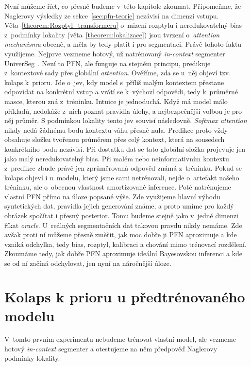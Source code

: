 Nyní můžeme říct, co přesně budeme v~této kapitole zkoumat.
Připomeňme, že Naglerovy výsledky ze sekce~\ref{sec:pfn-teorie} nezávisí na dimenzi vstupu.
Věta~\ref{theorem:Rozptyl_transformeru} o~mizení rozptylu i neredukovatelný bias z~podmínky lokality (věta~\ref{theorem:lokalizace}) jsou tvrzení o~\emph{attention mechanismu} obecně, a měla by tedy platit i pro segmentaci.
Právě tohoto faktu využijeme.
Nejprve vezmeme hotový, už natrénovaný \emph{in-context} segmenter UniverSeg~\cite{butoi2023}.
Není to PFN, ale funguje na stejném principu, predikuje z~kontextové sady přes globální \emph{attention}.
Ověříme, zda se u~něj objeví tzv. kolaps k~prioru.
Jde o~jev, kdy model s~příliš malým kontextem přestane odpovídat na konkrétní vstup a vrátí se k~výchozí odpovědi, tedy k~průměrné masce, kterou zná z~tréninku.
Intuice je jednoduchá.
Když má model málo příkladů, nedokáže z~nich poznat pravidla úlohy, a nejbezpečnější volbou je pro něj průměr.
S podmínkou lokality tento jev souvisí následovně.
\emph{Softmax attention} nikdy nedá žádnému bodu kontextu váhu přesně nula.
Predikce proto vždy obsahuje složku tvořenou průměrem přes celý kontext, která na sousedech konkrétního bodu nezávisí.
Při dostatku dat se tato globální složka projevuje jen jako malý neredukovatelný bias.
Při malém nebo neinformativním kontextu z~predikce zbude právě jen zprůměrovaná odpověď známá z~tréninku.
Pokud se kolaps objeví i u~modelu, který jsme sami netrénovali, nejde o~artefakt našeho tréninku, ale o~obecnou vlastnost amortizované inference.
Poté natrénujeme vlastní PFN přímo na úloze popsané výše.
Zde využijeme hlavní výhodu syntetických dat, pravidla jejich generování známe, a proto umíme pro každý obrázek spočítat i přesný posterior.
Tomu budeme stejně jako v~jedné dimenzi říkat \emph{oracle}.
U~reálných segmentačních dat takovou pravdu nikdy nemáme.
Zde avšak proti ní můžeme přesně změřit, jak moc dobře ji PFN aproximuje a kde vzniká odchylka, tedy bias, rozptyl, kalibraci a chování mimo trénovací rozdělení.
Zkoumáme tedy, jak dobře PFN aproximuje ideální Bayesovskou inferenci a kde se od ní začíná odchylovat, jen nyní na náročnější úloze.

\section{Kolaps k prioru u předtrénovaného modelu}
\label{sec:seg-universeg}

V~tomto prvním experimentu nebudeme trénovat vlastní model, ale vezmeme hotový \emph{in-context} segmenter a otestujeme na něm předpověď Naglerovy podmínky lokality.
\par

